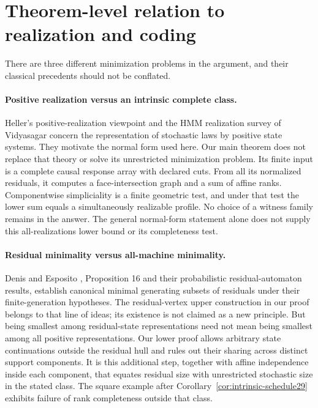 \section{Theorem-level relation to realization and coding}
\label{sec:literature29}
There are three different minimization problems in the argument, and
their classical precedents should not be conflated.

\paragraph{Positive realization versus an intrinsic complete class.}
Heller's positive-realization viewpoint and the HMM realization survey
of Vidyasagar \cite{Heller,Vidyasagar} concern the representation of
stochastic laws by positive state systems. They motivate the normal
form used here. Our main theorem does not replace that theory or
solve its unrestricted minimization problem. Its finite input is a
complete causal response array with declared cuts. From all its
normalized residuals, it computes a face-intersection graph and a sum
of affine ranks. Componentwise simpliciality is a finite geometric
test, and under that test the lower sum equals a simultaneously
realizable profile. No choice of a witness family remains in the
answer. The general normal-form statement alone does not supply this
all-realizations lower bound or its completeness test.

\paragraph{Residual minimality versus all-machine minimality.}
Denis and Esposito \cite{DenisEsposito}, Proposition 16 and their
probabilistic residual-automaton results, establish canonical minimal
generating subsets of residuals under their finite-generation
hypotheses. The residual-vertex upper construction in our proof belongs
to that line of ideas; its existence is not claimed as a new principle.
But being smallest among residual-state representations need not mean
being smallest among all positive representations. Our lower proof
allows arbitrary state continuations outside the residual hull and
rules out their sharing across distinct support components. It is
this additional step, together with affine independence inside each
component, that equates residual size with unrestricted stochastic
size in the stated class. The square example after
Corollary~\ref{cor:intrinsic-schedule29} exhibits failure of rank
completeness outside that class.

